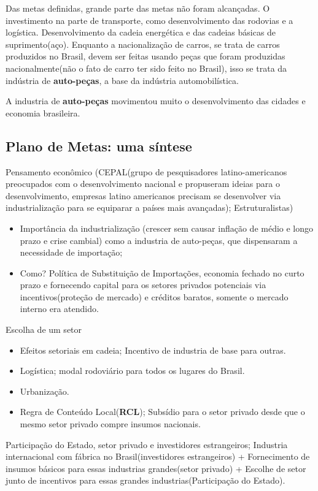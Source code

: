\documentclass[a4paper,12pt]{article}[abntex2]
\begin{document}
Das metas definidas, grande parte das metas não foram alcançadas. O investimento na parte de transporte, como desenvolvimento das rodovias e a logística. Desenvolvimento da cadeia energética e das cadeias básicas de suprimento(aço). Enquanto a nacionalização de carros, se trata de carros produzidos no Brasil, devem ser feitas usando peças que foram produzidas nacionalmente(não o fato de carro ter sido feito no Brasil), isso se trata da indústria de \textbf{auto-peças}, a base da indústria automobilística. 

A industria de \textbf{auto-peças} movimentou muito o desenvolvimento das cidades e economia brasileira.

\subsection{\textbf{Plano de Metas: uma síntese}}

Pensamento econômico (CEPAL(grupo de pesquisadores latino-americanos preocupados com o desenvolvimento nacional e propuseram ideias para o desenvolvimento, empresas latino americanos precisam se desenvolver via industrialização para se equiparar a países mais avançadas); Estruturalistas)\begin{itemize}
    \item Importância da industrialização (crescer sem causar inflação de médio e longo prazo e crise cambial) como a industria de auto-peças, que dispensaram a necessidade de importação;
    \item Como? Política de Substituição de Importações, economia fechado no curto prazo e fornecendo capital para os setores privados potenciais via incentivos(proteção de mercado) e créditos baratos, somente o mercado interno era atendido.
\end{itemize}
    
Escolha de um setor\begin{itemize}
    \item Efeitos setoriais em cadeia; Incentivo de industria de base para outras.
    \item Logística; modal rodoviário para todos os lugares do Brasil.
    \item Urbanização.
    \item Regra de Conteúdo Local(\textbf{RCL}); Subsídio para o setor privado desde que o mesmo setor privado compre insumos nacionais.
\end{itemize}

Participação do Estado, setor privado e investidores estrangeiros; Industria internacional com fábrica no Brasil(investidores estrangeiros) + Fornecimento de insumos básicos  para essas industrias grandes(setor privado) + Escolhe de setor junto de incentivos para essas grandes industrias(Participação do Estado).
\end{document}
